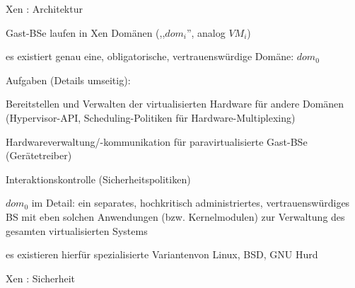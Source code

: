 \documentclass[a4paper]{article}
\begin{document}
\begin{multicols}{3}
    Xen : Architektur

    \begin{itemize*}
        \item
        Gast-BSe laufen in Xen Domänen (,,$dom_i$'', analog $VM_i$)
        \item
        es existiert genau eine, obligatorische, vertrauenswürdige Domäne:
        $dom_0$
        \item
        Aufgaben (Details umseitig):
        \begin{itemize*}
            \item Bereitstellen und Verwalten der virtualisierten Hardware für andere Domänen (Hypervisor-API, Scheduling-Politiken für Hardware-Multiplexing)
            \item Hardwareverwaltung/-kommunikation für paravirtualisierte Gast-BSe (Gerätetreiber)
            \item Interaktionskontrolle (Sicherheitspolitiken)
        \end{itemize*}
        \item
        $dom_0$ im Detail: ein separates, hochkritisch administriertes,
        vertrauenswürdiges BS mit eben solchen Anwendungen (bzw.
        Kernelmodulen) zur Verwaltung des gesamten virtualisierten Systems
        \begin{itemize*}
            \item es existieren hierfür spezialisierte Variantenvon Linux, BSD, GNU Hurd
        \end{itemize*}
    \end{itemize*}

    Xen : Sicherheit


\end{multicols}
\end{document}
